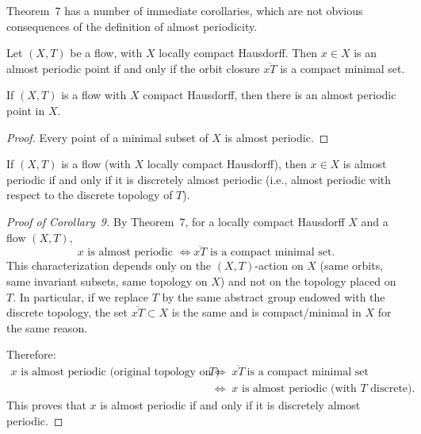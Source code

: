 Theorem~7 has a number of immediate corollaries, which are not obvious consequences of the definition of almost periodicity.

\begin{mynote}
    \begin{theorem*}[7]
        Let $(X,T)$ be a flow, with $X$ locally compact Hausdorff. Then $x \in X$ is an almost periodic point if and only if the orbit closure $\overline{xT}$ is a compact minimal set.
    \end{theorem*}
\end{mynote}

\begin{corollary*}[8]
    If $(X,T)$ is a flow with $X$ compact Hausdorff, then there is an almost periodic point in $X$.
\end{corollary*}

\begin{proof}
    Every point of a minimal subset of $X$ is almost periodic.
\end{proof}

\begin{corollary*}[9]
    If $(X,T)$ is a flow (with $X$ locally compact Hausdorff), then $x \in X$ is almost periodic if and only if it is discretely almost periodic (i.e., almost periodic with respect to the discrete topology of $T$).
\end{corollary*}

\begin{mynote}
    \begin{proof}[Proof of Corollary~9]
        By Theorem~7, for a locally compact Hausdorff $X$ and a flow $(X,T)$,
        \[
            x \text{ is almost periodic } \iff \overline{xT} \text{ is a compact minimal set.}
        \]
        This characterization depends only on the $(X,T)$-action on $X$ (same orbits, same invariant
        subsets, same topology on $X$) and not on the topology placed on $T$. In particular, if we
        replace $T$ by the same abstract group endowed with the discrete topology, the set
        $\overline{xT}\subset X$ is the same and is compact/minimal in $X$ for the same reason.

        Therefore:
        \begin{align*}
            x \text{ is almost periodic (original topology on $T$)}
            \; & \iff\; \overline{xT}\ \text{is a compact minimal set}    \\
               & \iff\; x \text{ is almost periodic (with $T$ discrete).}
        \end{align*}
        This proves that $x$ is almost periodic if and only if it is discretely almost periodic.
    \end{proof}
\end{mynote}


